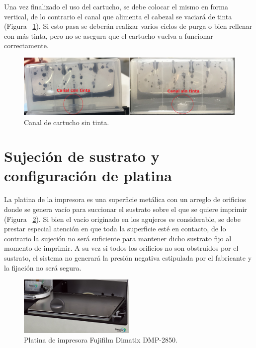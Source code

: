 Una vez finalizado el uso del cartucho, se debe colocar el mismo en forma vertical, de lo contrario el canal que alimenta el cabezal se vaciará de tinta (Figura ~\ref{fig:Figura_canal_cartucho_vacio}). Si esto pasa se deberán realizar varios ciclos de purga o bien rellenar con más tinta, pero no se asegura que el cartucho vuelva a funcionar correctamente.

\begin{figure}[H]
  \centering
    \includegraphics[width=1\textwidth]{Figuras/Figura_canal_cartucho_vacio}
  \caption{Canal de cartucho sin tinta.}
  \label{fig:Figura_canal_cartucho_vacio}
\end{figure}

\section{Sujeción de sustrato y configuración de platina}
La platina de la impresora es una superficie metálica con un arreglo de orificios donde se genera vacío para succionar el sustrato sobre el que se quiere imprimir (Figura ~\ref{fig:Figura_platina}). Si bien el vacío originado en los agujeros es considerable, se debe prestar especial atención en que toda la superficie esté en contacto, de lo contrario la sujeción no será suficiente para mantener dicho sustrato fijo al momento de imprimir. A su vez si todos los orificios no son obstruidos por el sustrato, el sistema no generará la presión negativa estipulada por el fabricante y la fijación no será segura.

\begin{figure}[H]
  \centering
    \includegraphics[width=0.5\textwidth]{Figuras/Figura_platina}
  \caption{Platina de impresora Fujifilm Dimatix DMP-2850.}
  \label{fig:Figura_platina}
\end{figure}

